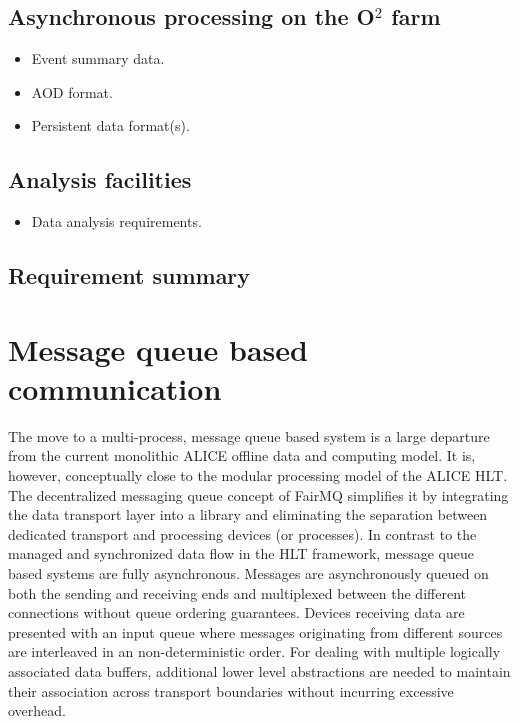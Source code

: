 \documentclass[a4paper,twoside]{article}
\def\O2{O$^2$}
\begin{document}
{\subsection{Asynchronous processing on the \O2 farm}

\begin{itemize}
  \item Event summary data.
  \item AOD format.
  \item Persistent data format(s).
\end{itemize}

\subsection{Analysis facilities}

\begin{itemize}
  \item Data analysis requirements.
\end{itemize}

\subsection{Requirement summary}

}


\section{Message queue based communication}
The move to a multi-process, message queue based system is a large departure from the current monolithic ALICE offline data and computing model. It is, however, conceptually close to the modular processing model of the ALICE HLT. The decentralized messaging queue concept of FairMQ simplifies it by integrating the data transport layer into a library and eliminating the separation between dedicated transport and processing devices (or processes).
In contrast to the managed and synchronized data flow in the HLT framework, message queue based systems are fully asynchronous. Messages are asynchronously queued on both the sending and receiving ends and multiplexed between the different connections without queue ordering guarantees. Devices receiving data are presented with an input queue where messages originating from different sources are interleaved in an non-deterministic order. For dealing with multiple logically associated data buffers, additional lower level abstractions are needed to maintain their association across transport boundaries without incurring excessive overhead.
\end{document}
